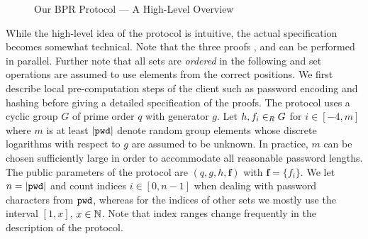 \begin{figure*}[htp]
{}
\caption{Our \ac{BPR} Protocol --- A High-Level Overview}
\label{fig:protocol-overview}
\end{figure*}


While the high-level idea of the protocol is intuitive, the actual specification becomes somewhat technical.
Note that the three proofs \PoM, \PoE and \PoS can be performed in parallel.
Further note that all sets are \emph{ordered} in the following and set operations are assumed to use elements from the correct positions.
We first describe local pre-computation steps of the client such as password encoding and hashing before giving a detailed specification of the proofs.
The protocol uses a cyclic group $G$ of prime order $q$ with generator $g$.
Let $h,f_i\in_R G$ for $i\in[-4,m]$ where $m$ is at least $|\mathtt{pwd}|$ denote random group elements whose discrete logarithms with respect to $g$ are assumed to be unknown. 
In practice, $m$ can be chosen sufficiently large in order to accommodate all reasonable password lengths. The public parameters of the protocol are $(q,g,h,\bm f)$ with $\bm f = \{f_i\}$.
We let $n = |\mathtt{pwd}|$ and count indices $i\in[0,n-1]$ when dealing with password characters from $\mathtt{pwd}$, whereas for the indices of other sets we mostly use the interval $[1,x]$, $x\in\mathbb{N}$. Note that index ranges change frequently in the description of the protocol.



